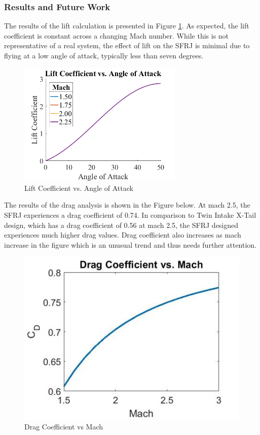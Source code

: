 \subsubsection{Results and Future Work}

The results of the lift calculation is presented in Figure \ref{fig:liftCoeff}. As expected, the lift coefficient is constant across a changing Mach number. While this is not representative of a real system, the effect of lift on the SFRJ is minimal due to flying at a low angle of attack, typically less than seven degrees.

\begin{figure}[H]
    \centering
    \includegraphics[width=0.7\textwidth]{LiftAndDragAnalysis/figures/LiftCoeffcAoA.png}
    \caption{Lift Coefficient vs. Angle of Attack}
    \label{fig:liftCoeff}
\end{figure}

The results of the drag analysis is shown in the Figure below. At mach 2.5, the SFRJ experiences a drag coefficient of 0.74. In comparison to Twin Intake X-Tail design, which has a drag coefficient of 0.56 at mach 2.5, the SFRJ designed experiences much higher drag values. Drag coefficient also increases as mach increase in the figure which is an unusual trend and thus needs further attention. 

\begin{figure}[H]
    \centering
    \includegraphics[width=0.7\linewidth]{LiftAndDragAnalysis/DragChart.png}
    \caption{Drag Coefficient vs Mach}
    \label{fig:Drag Coefficient}
\end{figure}

